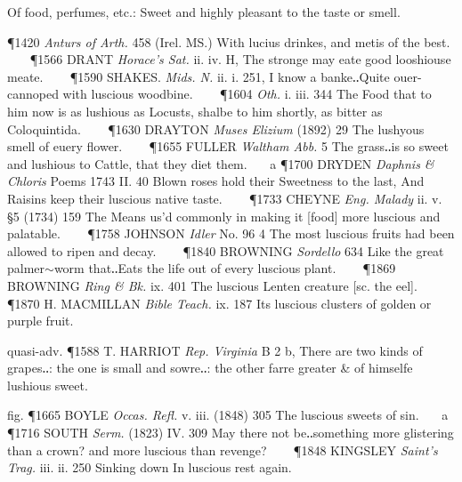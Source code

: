 \begin{description}[wide, labelwidth=!, labelindent=0pt]
\vspace{-0.3cm}

\begin{myenumerate}
 Of food, perfumes, etc.: Sweet and highly pleasant to the taste or smell.

\P 1420 \textit{Anturs  of Arth.} 458 (Irel. MS.) With lucius drinkes, and metis of the best.    
\P 1566 DRANT  \textit{Horace's Sat.} ii. iv. H, The stronge may eate good looshiouse meate.    
\P 1590 SHAKES.  \textit{Mids. N.} ii. i. 251, I know a banke‥Quite ouer-cannoped with luscious woodbine.    
\P 1604 \textit{Oth.} i. iii. 344 The Food that to him now is as lushious as Locusts, shalbe to him shortly, as bitter as Coloquintida.    
\P 1630 DRAYTON  \textit{Muses Elizium} (1892) 29 The lushyous smell of euery flower.    
\P 1655 FULLER  \textit{Waltham Abb.} 5 The grass‥is so sweet and lushious to Cattle, that they diet them.    a 
\P 1700 DRYDEN  \textit{Daphnis \& Chloris} Poems 1743 II. 40 Blown  roses hold their Sweetness to the last, And Raisins keep their luscious native taste.    
\P 1733 CHEYNE  \textit{Eng. Malady} ii. v. §5 (1734) 159 The Means us'd commonly in making it [food] more luscious and palatable.    
\P 1758 JOHNSON  \textit{Idler} No. 96 4 The most luscious fruits had been allowed to ripen and decay.    
\P 1840 BROWNING  \textit{Sordello} 634 Like the great palmer$\sim$worm that‥Eats the life out of every luscious plant.    
\P 1869 BROWNING  \textit{Ring \& Bk.} ix. 401 The luscious Lenten creature [sc. the eel].    
\P 1870 H. MACMILLAN  \textit{Bible Teach.} ix. 187 Its luscious clusters of golden or purple fruit.

quasi-adv. \P 1588 T. HARRIOT  \textit{Rep. Virginia} B 2 b, There are two kinds of grapes‥: the one is small and sowre‥: the other farre greater \& of himselfe lushious sweet.

fig. \P 1665 BOYLE  \textit{Occas. Refl.} v. iii. (1848) 305 The luscious sweets of sin.    a 
\P 1716 SOUTH  \textit{Serm.} (1823) IV. 309 May there not be‥something more glistering than a crown? and more luscious than revenge?    
\P 1848 KINGSLEY  \textit{Saint's Trag.} iii. ii. 250 Sinking down In luscious rest again.


\end{myenumerate}
\end{description}
